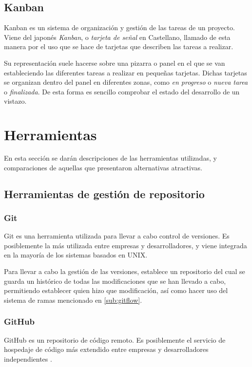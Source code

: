 \subsection{Kanban}
\label{sub:Kanban}

Kanban es un sistema de organización y gestión de las tareas de un proyecto. \citep{wiki:Kanban}
Viene del japonés \textit{Kanban}, o \textit{tarjeta de señal} en Castellano, llamado de esta manera por el uso que se hace de tarjetas que describen las tareas a realizar. 

Su representación suele hacerse sobre una pizarra o panel en el que se van estableciendo las diferentes tareas a realizar en pequeñas tarjetas. Dichas tarjetas se organizan dentro del panel en diferentes zonas, como \textit{en progreso} o \textit{nueva tarea} o \textit{finalizada}. 
De esta forma es sencillo comprobar el estado del desarrollo de un vistazo. 

\section{Herramientas}
En esta sección se darán descripciones de las herramientas utilizadas, y comparaciones de aquellas que presentaron alternativas atractivas.
\subsection{Herramientas de gestión de repositorio}
\subsubsection{Git}

Git es una herramienta utilizada para llevar a cabo control de versiones. Es posiblemente la más utilizada entre empresas y desarrolladores, y viene integrada en la mayoría de los sistemas basados en UNIX.

Para llevar a cabo la gestión de las versiones, establece un repositorio del cual se guarda un histórico de todas las modificaciones que se han llevado a cabo, permitiendo establecer quien hizo que modificación, así como hacer uso del sistema de ramas mencionado en \ref{sub:gitflow}. 

\subsubsection{GitHub}

GitHub es un repositorio de código remoto. Es posiblemente el servicio de hospedaje de código más extendido entre empresas y desarrolladores independientes \citep{wiki:GitHub}.

